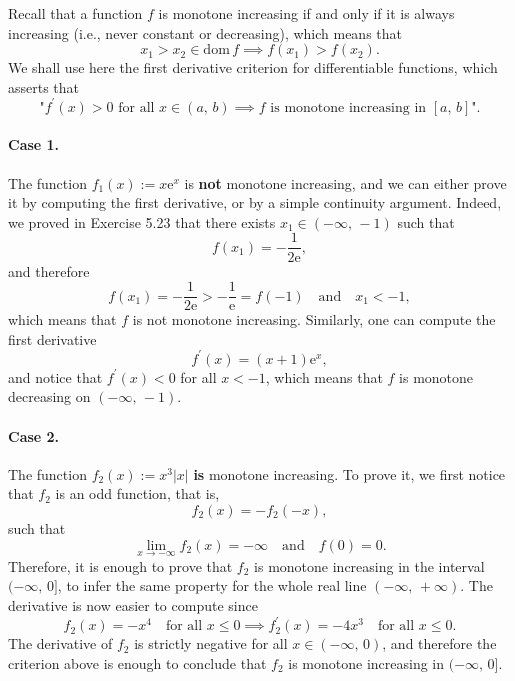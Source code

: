 \documentclass[a4paper,10 pt]{report}
\theoremstyle{definition}
\begin{document}
\begin{solutionBox} Recall that a function $f$ is monotone increasing if and only if it is always increasing (i.e., never constant or decreasing), which means that
\begin{equation*}x_1 > x_2 \in \mathrm{dom} \, f \implies f(x_1) > f(x_2). \end{equation*}
We shall use here the first derivative criterion for differentiable functions, which asserts that
\begin{equation*}\text{"$f^\prime(x) > 0$ for all $x \in (a, \, b)$} \implies \text{$f$ is monotone increasing in $[a, \, b]$"}. \end{equation*}

\paragraph{Case 1.} The function $f_1(x) := x \mathrm{e}^x$ is \textbf{not} monotone increasing, and we can either prove it by computing the first derivative, or by a simple continuity argument. Indeed, we proved in Exercise 5.23 that there exists $x_1 \in (- \infty, \, -1)$ such that
\begin{equation*} f(x_1) = - \frac{1}{2\mathrm{e}}, \end{equation*}
and therefore
\begin{equation*} f(x_1) = - \frac{1}{2\mathrm{e}} > - \frac{1}{\mathrm{e}} = f(-1) \quad \text{and} \quad x_1 < -1, \end{equation*}
which means that $f$ is not monotone increasing. Similarly, one can compute the first derivative
\begin{equation*} f^\prime(x) = (x + 1) \mathrm{e}^x, \end{equation*}
and notice that $f^\prime(x) < 0$ for all $x < - 1$, which means that $f$ is monotone decreasing on $(- \infty, \, -1)$.

\paragraph{Case 2.} The function $f_2(x) := x^3 |x|$ \textbf{is} monotone increasing. To prove it, we first notice that $f_2$ is an odd function, that is,
\begin{equation*} f_2(x) = - f_2(-x), \end{equation*}
such that
\begin{equation*} \lim_{x \to - \infty} f_2(x) = - \infty \quad \text{and} \quad f(0)=0.\end{equation*}
Therefore, it is enough to prove that $f_2$ is monotone increasing in the interval $(- \infty, \, 0]$, to infer the same property for the whole real line $(- \infty, \, + \infty)$. The derivative is now easier to compute since
\begin{equation*} f_2(x) = - x^4 \quad \text{for all $x \leq 0$} \implies f_2^\prime(x) = - 4x^3 \quad \text{for all $x \leq 0$}.\end{equation*}
The derivative of $f_2$ is strictly negative for all $x \in (- \infty, \, 0)$, and therefore the criterion above is enough to conclude that $f_2$ is monotone increasing in $(- \infty, \, 0]$. 


\end{solutionBox}
\end{document}

